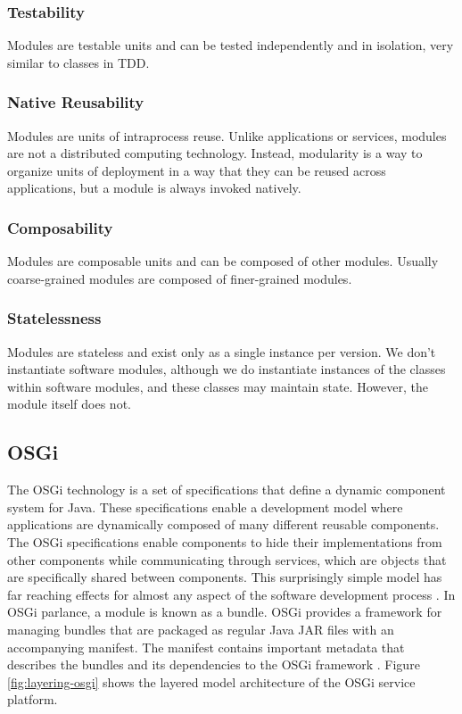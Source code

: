 \subsubsection{Testability}
Modules are testable units and can be tested independently and in isolation, very similar to classes in \gls{TDD}.

\subsubsection{Native Reusability}
Modules are units of intraprocess reuse. Unlike applications or services, modules are not a distributed computing technology. Instead, modularity is a way to organize units of deployment in a way that they can be reused across applications, but a module is always invoked natively.

\subsubsection{Composability}
Modules are composable units and can be composed of other modules. Usually coarse-grained modules are composed of finer-grained modules.

\subsubsection{Statelessness}
Modules are stateless and exist only as a single instance per version. We don’t instantiate software modules, although we do instantiate instances of the classes within software modules, and these classes may maintain state. However, the module itself does not.


\newpage
\subsection{OSGi}
The \gls{OSGi} technology is a set of specifications that define a dynamic component system for Java. These specifications enable a development model where applications are dynamically composed of many different reusable components. The \gls{OSGi} specifications enable components to hide their implementations from other components while communicating through services, which are objects that are specifically shared between components. This surprisingly simple model has far reaching effects for almost any aspect of the software development process \cite{OSGi}. In OSGi parlance, a module is known as a bundle. OSGi provides a framework for managing bundles that are packaged as regular Java JAR files with an accompanying manifest. The manifest contains important metadata that describes the bundles and its dependencies to the OSGi framework \cite{Knoernschild:2012}. Figure \ref{fig:layering-osgi} shows the layered model architecture of the \gls{OSGi} service platform.

